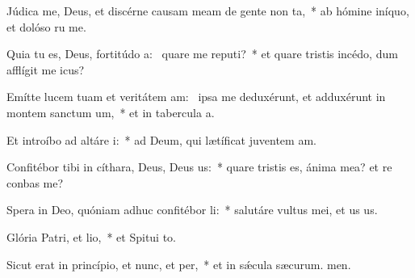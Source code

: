 \item Júdica me, Deus, et discérne causam meam de gente non ta,~* ab hómine iníquo, et dolóso ru me.
\item Quia tu es, Deus, fortitúdo a:~\pscross{} quare me reputi?~* et quare tristis incédo, dum afflígit me icus?
\item Emítte lucem tuam et veritátem am:~\pscross{} ipsa me deduxérunt, et adduxérunt in montem sanctum um,~* et in tabercula a.
\item Et introíbo ad altáre i:~* ad Deum, qui lætíficat juventem am.
\item Confitébor tibi in cíthara, Deus, Deus us:~* quare tristis es, ánima mea? et re conbas me?
\item Spera in Deo, quóniam adhuc confitébor li:~* salutáre vultus mei, et us us.
\item Glória Patri, et lio,~* et Spitui to.
\item Sicut erat in princípio, et nunc, et per,~* et in sǽcula sæcurum. men.
